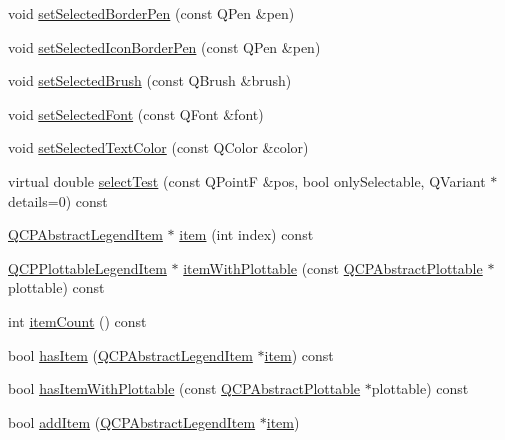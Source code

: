 \begin{DoxyCompactItemize}
\item 
void \mbox{\hyperlink{class_q_c_p_legend_a2c35d262953a25d96b6112653fbefc88}{set\+Selected\+Border\+Pen}} (const Q\+Pen \&pen)
\item 
void \mbox{\hyperlink{class_q_c_p_legend_ade93aabe9bcccaf9cf46cec22c658027}{set\+Selected\+Icon\+Border\+Pen}} (const Q\+Pen \&pen)
\item 
void \mbox{\hyperlink{class_q_c_p_legend_a875227f3219c9799464631dec5e8f1bd}{set\+Selected\+Brush}} (const Q\+Brush \&brush)
\item 
void \mbox{\hyperlink{class_q_c_p_legend_ab580a01c3c0a239374ed66c29edf5ad2}{set\+Selected\+Font}} (const Q\+Font \&font)
\item 
void \mbox{\hyperlink{class_q_c_p_legend_a7674dfc7a1f30e1abd1018c0ed45e0bc}{set\+Selected\+Text\+Color}} (const Q\+Color \&color)
\item 
virtual double \mbox{\hyperlink{class_q_c_p_legend_acd7be544c81324e391cfa6be9c413c01}{select\+Test}} (const Q\+PointF \&pos, bool only\+Selectable, Q\+Variant $\ast$details=0) const
\item 
\mbox{\hyperlink{class_q_c_p_abstract_legend_item}{Q\+C\+P\+Abstract\+Legend\+Item}} $\ast$ \mbox{\hyperlink{class_q_c_p_legend_acfe9694c45104a3359d3806ed366fcf7}{item}} (int index) const
\item 
\mbox{\hyperlink{class_q_c_p_plottable_legend_item}{Q\+C\+P\+Plottable\+Legend\+Item}} $\ast$ \mbox{\hyperlink{class_q_c_p_legend_a91e790002d8bf15a20628a8e8841e397}{item\+With\+Plottable}} (const \mbox{\hyperlink{class_q_c_p_abstract_plottable}{Q\+C\+P\+Abstract\+Plottable}} $\ast$plottable) const
\item 
int \mbox{\hyperlink{class_q_c_p_legend_a57ab86ab8b2a3762d4c1455eb5452c88}{item\+Count}} () const
\item 
bool \mbox{\hyperlink{class_q_c_p_legend_ad0f698e33db454a6c103b5206740e599}{has\+Item}} (\mbox{\hyperlink{class_q_c_p_abstract_legend_item}{Q\+C\+P\+Abstract\+Legend\+Item}} $\ast$\mbox{\hyperlink{class_q_c_p_legend_acfe9694c45104a3359d3806ed366fcf7}{item}}) const
\item 
bool \mbox{\hyperlink{class_q_c_p_legend_a4b90a442af871582df85c2bc13f91e88}{has\+Item\+With\+Plottable}} (const \mbox{\hyperlink{class_q_c_p_abstract_plottable}{Q\+C\+P\+Abstract\+Plottable}} $\ast$plottable) const
\item 
bool \mbox{\hyperlink{class_q_c_p_legend_a3ab274de52d2951faea45a6d975e6b3f}{add\+Item}} (\mbox{\hyperlink{class_q_c_p_abstract_legend_item}{Q\+C\+P\+Abstract\+Legend\+Item}} $\ast$\mbox{\hyperlink{class_q_c_p_legend_acfe9694c45104a3359d3806ed366fcf7}{item}})

\end{DoxyCompactItemize}
